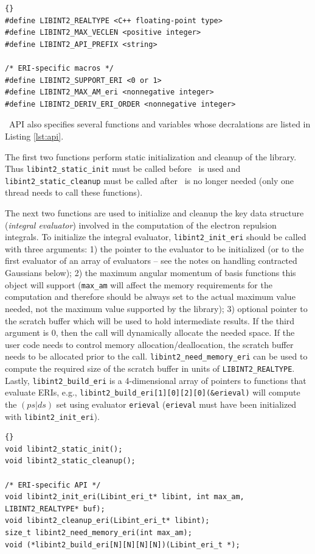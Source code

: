 \documentclass[10pt]{article}
\begin{document}
\begin{lstlisting}[label=lst:valmacros,caption=C preprocessor value macros
provided by \libinth . The angled brackets describe valid macro values.]{}
#define LIBINT2_REALTYPE <C++ floating-point type>
#define LIBINT2_MAX_VECLEN <positive integer>
#define LIBINT2_API_PREFIX <string>

/* ERI-specific macros */
#define LIBINT2_SUPPORT_ERI <0 or 1>
#define LIBINT2_MAX_AM_eri <nonnegative integer>
#define LIBINT2_DERIV_ERI_ORDER <nonnegative integer>
\end{lstlisting}

\LIBINT\ API also specifies several functions and variables whose decralations
are listed in Listing \ref{lst:api}.

The first two functions perform static initialization and cleanup of the library.
Thus {\tt libint2\_static\_init} must be called before \LIBINT\ is used and
{\tt libint2\_static\_cleanup} must be called after \LIBINT\ is no longer needed (only one thread needs to call these functions).

The next two functions are used to initialize and cleanup the key data
structure ({\em integral evaluator}) involved in the computation of the electron repulsion integrals.
To initialize the integral evaluator, {\tt libint2\_init\_eri} should be called with three arguments:
1) the pointer to the evaluator to be initialized (or to the first evaluator of an array of evaluators -- see the notes on handling contracted Gaussians below); 2) the maximum angular momentum
of basis functions this object will support ({\tt max\_am} will affect the memory requirements
for the computation and therefore should be always set to the actual maximum value needed,
not the maximum value supported by the library); 3) optional pointer to the scratch buffer
which will be used to hold intermediate results. If the third argument is 0, then
the call will dynamically allocate the needed space. If the user code needs to control
memory allocation/deallocation, the scratch buffer needs to be allocated prior to the call.
{\tt libint2\_need\_memory\_eri} can be used to compute the required size of
the scratch buffer in units of {\tt LIBINT2\_REALTYPE}. Lastly, {\tt libint2\_build\_eri} is a 4-dimensional
array of pointers to functions that evaluate ERIs, e.g., {\tt libint2\_build\_eri[1][0][2][0](\&erieval)}
will compute the $(ps|ds)$ set using evaluator {\tt erieval} ({\tt erieval} must have been initialized
with {\tt libint2\_init\_eri}).

\begin{lstlisting}[label=lst:api,caption=\LIBINT\ API  functions and data.
{\tt N = LIBINT2\_MAX\_AM\_ERI + 1}.]{}
void libint2_static_init();
void libint2_static_cleanup();

/* ERI-specific API */
void libint2_init_eri(Libint_eri_t* libint, int max_am, LIBINT2_REALTYPE* buf);
void libint2_cleanup_eri(Libint_eri_t* libint);
size_t libint2_need_memory_eri(int max_am);
void (*libint2_build_eri[N][N][N][N])(Libint_eri_t *);
\end{lstlisting}
\end{document}
